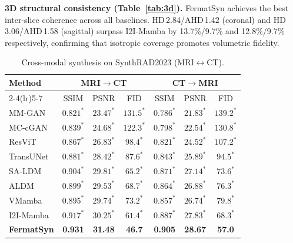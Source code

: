 \documentclass[runningheads]{llncs}
\begin{document}
\noindent\textbf{3D structural consistency (Table~\ref{tab:3d}).}
FermatSyn achieves the best inter-slice coherence across all baselines.
HD\,2.84/AHD\,1.42 (coronal) and HD\,3.06/AHD\,1.58 (sagittal)
surpass I2I-Mamba by 13.7\%/9.7\% and 12.8\%/9.7\% respectively,
confirming that isotropic coverage promotes volumetric fidelity.

\begin{table}[t]
\centering
\begin{minipage}[t]{0.61\textwidth}
\centering
\caption{Cross-modal synthesis on SynthRAD2023 (MRI$\leftrightarrow$CT).}
\label{tab:cross}
\setlength{\tabcolsep}{1.5pt}
\fontsize{6.5}{7.5}\selectfont
\begin{tabular}{lcccccc}
\toprule
\multirow{2}{*}{Method}
  & \multicolumn{3}{c}{MRI$\to$CT}
  & \multicolumn{3}{c}{CT$\to$MRI} \\
\cmidrule(lr){2-4}\cmidrule(lr){5-7}
  & SSIM & PSNR & FID & SSIM & PSNR & FID \\
\midrule
MM-GAN~\cite{sharma2019missing}   &$0.821^*$&$23.47^*$&$131.5^*$ &$0.786^*$&$21.83^*$&$139.2^*$ \\
MC-cGAN~\cite{dar2019image}       &$0.839^*$&$24.68^*$&$122.3^*$ &$0.798^*$&$22.54^*$&$130.8^*$ \\
ResViT~\cite{Dalmaz2022ResViT}    &$0.867^*$&$26.83^*$&$98.4^*$  &$0.821^*$&$24.52^*$&$107.2^*$ \\
TransUNet~\cite{chen2021transunet}&$0.881^*$&$28.42^*$&$87.6^*$  &$0.843^*$&$25.89^*$&$94.5^*$ \\
SA-LDM~\cite{zhang2025structure}  &$0.904^*$&$29.81^*$&$65.2^*$  &$0.871^*$&$27.14^*$&$73.6^*$ \\
ALDM~\cite{Kim_2024_WACV}         &$0.899^*$&$29.53^*$&$68.7^*$  &$0.864^*$&$26.88^*$&$76.3^*$ \\
VMamba~\cite{Liu2024VMamba}       &$0.895^*$&$29.74^*$&$73.2^*$  &$0.857^*$&$26.74^*$&$79.8^*$ \\
I2I-Mamba~\cite{xing2024i2imamba}&\underline{$0.917^*$}&\underline{$30.25^*$}&\underline{$61.4^*$}
                                  &\underline{$0.887^*$}&\underline{$27.83^*$}&\underline{$68.3^*$} \\
\midrule
\textbf{FermatSyn} &\textbf{0.931}&\textbf{31.48}&\textbf{46.7}
                   &\textbf{0.905}&\textbf{28.67}&\textbf{57.0} \\
\bottomrule
\end{tabular}
\end{minipage}\hspace{0.04\textwidth}%
\begin{minipage}[t]{0.35\textwidth}

\end{minipage}
\end{table}
\end{document}
